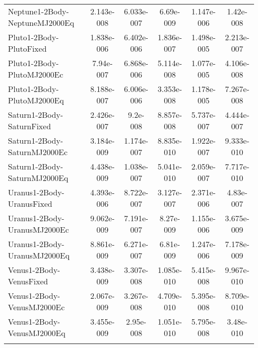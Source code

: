 \begin{table}[htbp!]
\begin{tabular}{lccccc}
         Neptune1-2Body-NeptuneMJ2000Eq & 2.143e-008 & 6.033e-007 & 6.69e-009 & 1.147e-006 & 1.42e-008 \\
         Pluto1-2Body-PlutoFixed & 1.838e-006 & 6.402e-006 & 1.836e-007 & 1.498e-005 & 2.213e-007 \\
         Pluto1-2Body-PlutoMJ2000Ec & 7.94e-007 & 6.868e-006 & 5.114e-008 & 1.077e-005 & 4.106e-008 \\
         Pluto1-2Body-PlutoMJ2000Eq & 8.188e-007 & 6.006e-006 & 3.353e-008 & 1.178e-005 & 7.267e-008 \\
         Saturn1-2Body-SaturnFixed & 2.426e-007 & 9.2e-008 & 8.857e-008 & 5.737e-007 & 4.444e-007 \\
         Saturn1-2Body-SaturnMJ2000Ec & 3.184e-009 & 1.174e-007 & 8.835e-010 & 1.922e-007 & 9.333e-010 \\
         Saturn1-2Body-SaturnMJ2000Eq & 4.438e-009 & 1.038e-007 & 5.041e-010 & 2.059e-007 & 7.717e-010 \\
         Uranus1-2Body-UranusFixed & 4.393e-006 & 8.722e-007 & 3.127e-007 & 2.371e-006 & 4.83e-007 \\
         Uranus1-2Body-UranusMJ2000Ec & 9.062e-009 & 7.191e-007 & 8.27e-009 & 1.155e-006 & 3.675e-009 \\
         Uranus1-2Body-UranusMJ2000Eq & 8.861e-009 & 6.271e-007 & 6.81e-009 & 1.247e-006 & 7.178e-009 \\
         Venus1-2Body-VenusFixed & 3.438e-009 & 3.307e-008 & 1.085e-010 & 5.415e-008 & 9.967e-010 \\
         Venus1-2Body-VenusMJ2000Ec & 2.067e-009 & 3.267e-008 & 4.709e-010 & 5.395e-008 & 8.709e-010 \\
         Venus1-2Body-VenusMJ2000Eq & 3.455e-009 & 2.95e-008 & 1.051e-010 & 5.795e-008 & 3.48e-010 \\
      \hline\hline
      \label{Table: MacGMAT-STK CS Parameters Set 5} 
\end{tabular}
\end{table}
